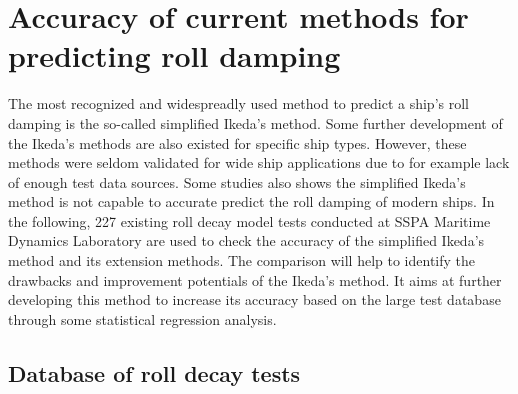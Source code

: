 \section{Accuracy of current methods for predicting roll damping}
\label{se:accuracy_SI_method}
The most recognized and widespreadly used method to predict a ship's roll damping is the so-called simplified Ikeda's method. Some further development of the Ikeda's methods are also existed for specific ship types. However, these methods were seldom validated for wide ship applications due to for example lack of enough test data sources. Some studies also shows the simplified Ikeda's method is not capable to accurate predict the roll damping of modern ships. In the following, 227 existing roll decay model tests conducted at SSPA Maritime Dynamics Laboratory are used to check the accuracy of the simplified Ikeda's method and its extension methods. The comparison will help to identify the drawbacks and improvement potentials of the Ikeda's method. It aims at further developing this method to increase its accuracy based on the large test database through some statistical regression analysis.     

\subsection{Database of roll decay tests}
\label{se:database_of_roll_decay_tests}




